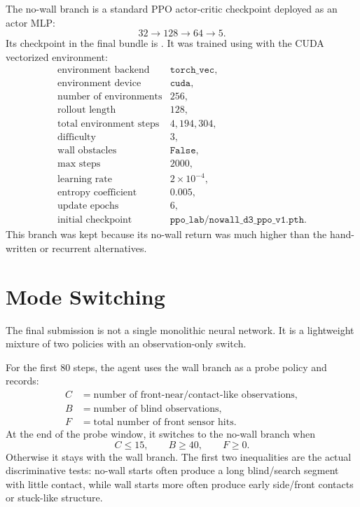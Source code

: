 \documentclass[11pt]{article}
\begin{document}
The no-wall branch is a standard PPO actor-critic checkpoint deployed as an actor MLP:
\[
  32 \rightarrow 128 \rightarrow 64 \rightarrow 5.
\]
Its checkpoint in the final bundle is .  It was
trained using  with the CUDA vectorized environment:
\[
\begin{array}{ll}
\text{environment backend} & \texttt{torch\_vec},\\
\text{environment device} & \texttt{cuda},\\
\text{number of environments} & 256,\\
\text{rollout length} & 128,\\
\text{total environment steps} & 4{,}194{,}304,\\
\text{difficulty} & 3,\\
\text{wall obstacles} & \texttt{False},\\
\text{max steps} & 2000,\\
\text{learning rate} & 2\times10^{-4},\\
\text{entropy coefficient} & 0.005,\\
\text{update epochs} & 6,\\
\text{initial checkpoint} & \texttt{ppo\_lab/nowall\_d3\_ppo\_v1.pth}.
\end{array}
\]
This branch was kept because its no-wall return was much higher than the hand-written
or recurrent alternatives.

\section{Mode Switching}

The final submission is not a single monolithic neural network.  It is a lightweight
mixture of two policies with an observation-only switch.

For the first 80 steps, the agent uses the wall branch as a probe policy and records:
\[
\begin{aligned}
  C &= \text{number of front-near/contact-like observations},\\
  B &= \text{number of blind observations},\\
  F &= \text{total number of front sensor hits}.
\end{aligned}
\]
At the end of the probe window, it switches to the no-wall branch when
\[
  C \le 15,\qquad B \ge 40,\qquad F \ge 0.
\]
Otherwise it stays with the wall branch.  The first two inequalities are the actual
discriminative tests: no-wall starts often produce a long blind/search segment with
little contact, while wall starts more often produce early side/front contacts or
stuck-like structure.
\end{document}

